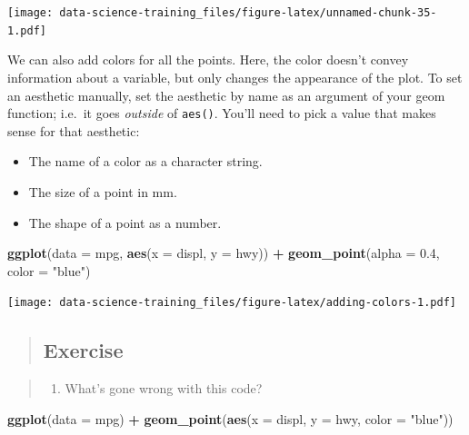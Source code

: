\documentclass[]{book}
\newenvironment{Shaded}{\begin{snugshade}}{\end{snugshade}}
\newcommand{\KeywordTok}[1]{\textcolor[rgb]{0.13,0.29,0.53}{\textbf{#1}}}
\newcommand{\DataTypeTok}[1]{\textcolor[rgb]{0.13,0.29,0.53}{#1}}
\newcommand{\FloatTok}[1]{\textcolor[rgb]{0.00,0.00,0.81}{#1}}
\newcommand{\StringTok}[1]{\textcolor[rgb]{0.31,0.60,0.02}{#1}}
\newcommand{\OperatorTok}[1]{\textcolor[rgb]{0.81,0.36,0.00}{\textbf{#1}}}
\newcommand{\NormalTok}[1]{#1}
\providecommand{\tightlist}{%
  \setlength{\itemsep}{0pt}\setlength{\parskip}{0pt}}
\theoremstyle{definition}
\theoremstyle{definition}
\theoremstyle{definition}
\theoremstyle{remark}
\begin{document}
\texttt{[image: data-science-training\_files/figure-latex/unnamed-chunk-35-1.pdf]}

We can also add colors for all the points. Here, the color doesn't
convey information about a variable, but only changes the appearance of
the plot. To set an aesthetic manually, set the aesthetic by name as an
argument of your geom function; i.e.~it goes \emph{outside} of
\texttt{aes()}. You'll need to pick a value that makes sense for that
aesthetic:

\begin{itemize}
\item
  The name of a color as a character string.
\item
  The size of a point in mm.
\item
  The shape of a point as a number.
\end{itemize}

\begin{Shaded}
\begin{Highlighting}[]
\KeywordTok{ggplot}\NormalTok{(}\DataTypeTok{data =}\NormalTok{ mpg, }\KeywordTok{aes}\NormalTok{(}\DataTypeTok{x =}\NormalTok{ displ, }\DataTypeTok{y =}\NormalTok{ hwy)) }\OperatorTok{+}
\StringTok{    }\KeywordTok{geom_point}\NormalTok{(}\DataTypeTok{alpha =} \FloatTok{0.4}\NormalTok{, }\DataTypeTok{color =} \StringTok{"blue"}\NormalTok{)}
\end{Highlighting}
\end{Shaded}

\texttt{[image: data-science-training\_files/figure-latex/adding-colors-1.pdf]}

\begin{quote}
\subsection{Exercise}\label{exercise-1}
\end{quote}

\begin{quote}
\begin{enumerate}
\def\labelenumi{\arabic{enumi}.}
\tightlist
\item
  What's gone wrong with this code?
\end{enumerate}
\end{quote}

\begin{Shaded}
\begin{Highlighting}[]
    \KeywordTok{ggplot}\NormalTok{(}\DataTypeTok{data =}\NormalTok{ mpg) }\OperatorTok{+}\StringTok{ }
\StringTok{      }\KeywordTok{geom_point}\NormalTok{(}\KeywordTok{aes}\NormalTok{(}\DataTypeTok{x =}\NormalTok{ displ, }\DataTypeTok{y =}\NormalTok{ hwy, }\DataTypeTok{color =} \StringTok{"blue"}\NormalTok{))}
\end{Highlighting}
\end{Shaded}
\end{document}
